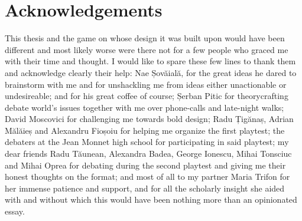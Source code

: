 \documentclass[12pt]{article}
\begin{document}
\begin{abstract}
This thesis applies transformative game design theory to competitive debate, treating major debate formats not as fixed institutions but as designed games open to deliberate redesign. Although forensics pedagogy has long documented debate's transformative effects, no prior work analyses debate formats from a game-design perspective or brings transformative role-playing-game theory to bear on them. Working at this gap, the thesis asks \emph{how} such theory can be operationalised into a concrete format, and \emph{how} participants respond to the format that results.

Using Research through Design, and specifically an evocative design experiment, I develop and playtest \emph{Inside Out}, a new role-playing debate format built to address three tendencies observed in World Schools and British Parliamentary debate: value convergence, information density, and competitive hierarchy. The format replaces binary opposition and win/loss adjudication with several value-defending teams, a deciding Subject character, and a commendation-based system of evaluation. Two playtest cycles with experienced debaters were analysed through a pre-specified taxonomy of behavioural and self-reported clues.

The contribution includes a documented design and an account of how its mechanics shape the experience of those who play it, including emergent effects the design did not set out to produce. Beyond the artifact, the thesis debates intermediate-level design knowledge about how one might design for transformation in deliberative games by using and the scaffold of debate.
\end{abstract}


\section*{Acknowledgements}

This thesis and the game on whose design it was built upon would have been different and most likely worse were there not for a few people who graced me with their time and thought. I would like to spare these few lines to thank them and acknowledge clearly their help: Nae Șovăială, for the great ideas he dared to brainstorm with me and for unshackling me from ideas either unactionable or undesireable; and for his great coffee of course; Șerban Pitic for theorycrafting debate world's issues together with me over phone-calls and late-night walks; David Moscovici for challenging me towards bold design; Radu Țigănaș, Adrian Mălăieș and Alexandru Fioșoiu for helping me organize the first playtest; the debaters at the Jean Monnet high school for participating in said playtest; my dear friends Radu Tăunean, Alexandra Badea, George Ionescu, Mihai Tonsciuc and Mihai Oprea for debating during the second playtest and giving me their honest thoughts on the format; and most of all to my partner Maria Trifon for her immense patience and support, and for all the scholarly insight she aided with and without which this would have been nothing more than an opinionated essay.
\end{document}
